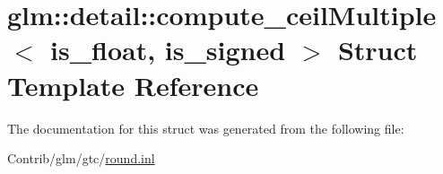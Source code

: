 \hypertarget{structglm_1_1detail_1_1compute__ceil_multiple}{}\section{glm\+:\+:detail\+:\+:compute\+\_\+ceil\+Multiple$<$ is\+\_\+float, is\+\_\+signed $>$ Struct Template Reference}
\label{structglm_1_1detail_1_1compute__ceil_multiple}


The documentation for this struct was generated from the following file\+:\begin{DoxyCompactItemize}
\item 
Contrib/glm/gtc/\mbox{\hyperlink{round_8inl}{round.\+inl}}\end{DoxyCompactItemize}
